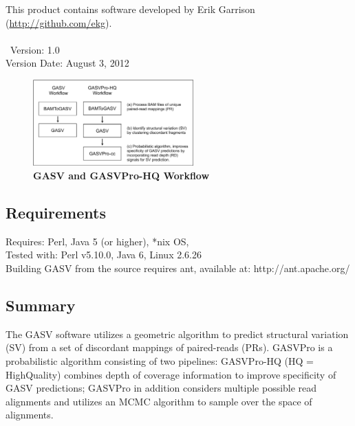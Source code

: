 \documentclass[11pt]{article}
\begin{document}
\noindent This product contains software developed by Erik Garrison (\url{http://github.com/ekg}).\\ \\ 
\
\noindent Version: 1.0\\
\noindent Version Date: August 3, 2012

\begin{figure}
  \begin{center}
    \includegraphics[width=0.55\textwidth]{Figures/GASV_Workflow.pdf}
  \end{center}
  \caption{\textbf{GASV and GASVPro-HQ Workflow}}
  \label{fig:GASVWorkflow}
\end{figure}

\subsection{Requirements}
Requires: Perl, Java 5 (or higher), *nix OS, \\
\noindent Tested with: Perl v5.10.0, Java 6, Linux 2.6.26 \\

\noindent Building GASV from the source requires ant, available at: 
http://ant.apache.org/ 


\subsection{Summary}

The GASV software utilizes a geometric algorithm to predict structural variation (SV) from a set of discordant mappings of paired-reads (PRs).  GASVPro is a probabilistic algorithm consisting of two pipelines: GASVPro-HQ (HQ = HighQuality) combines depth of coverage information to improve specificity of GASV predictions; GASVPro in addition considers multiple possible read alignments and utilizes an MCMC algorithm to sample over the space of alignments.
\end{document}
